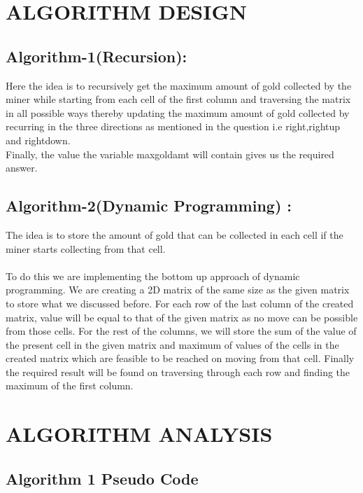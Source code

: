 \documentclass[conference]{IEEEtran}
\begin{document}
\section{ALGORITHM DESIGN}



\subsection{Algorithm-1(Recursion):}

Here the idea is to recursively get the maximum amount of gold collected by the miner while starting from each cell of the first column and traversing the matrix in all possible ways thereby updating the maximum amount of gold collected by recurring  in the three directions as mentioned in the question i.e right,right\textunderscore up and right\textunderscore down.\\
Finally, the value the variable max\textunderscore gold\textunderscore amt will contain gives us the required answer.


\subsection{Algorithm-2(Dynamic Programming) :}

The idea is to store the amount of gold that can be collected in each cell if the miner starts collecting from that cell.\\\\

To do this we are implementing the bottom up approach of dynamic programming. We are creating a 2D matrix of the same size as the given matrix to store what we discussed before. For each row of the last column of the created matrix, value will be equal to that of the given matrix as no move can be possible from those cells. For the rest of the columns, we will store the sum of the value of the present cell in the given matrix and maximum of values of the cells in the created matrix which are feasible to be reached on moving from that cell. Finally the required result will be found on traversing through each row and finding the maximum of the first column.



\section{ALGORITHM ANALYSIS}

\subsection{Algorithm 1 Pseudo Code}\label{AA}
\end{document}
